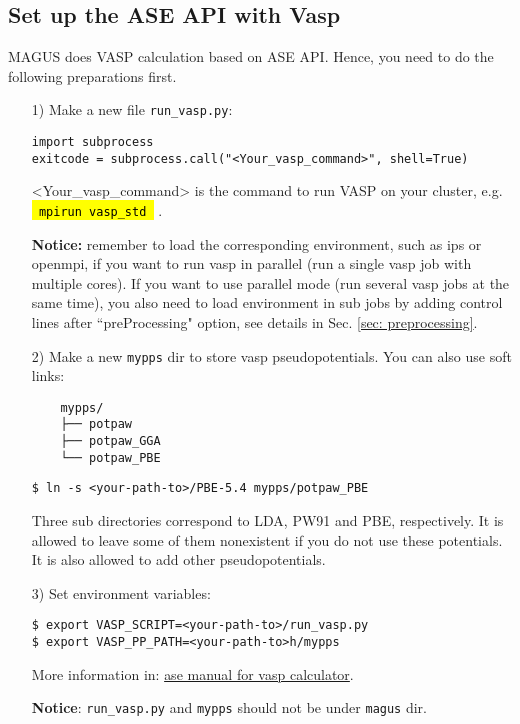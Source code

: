 \documentclass[12pt,oneside]{book}
\newcommand{\code}[1]{
  \begingroup
  \sethlcolor{Seashell}
  {\hl{\texttt{~#1~}}}
  \endgroup
}
\newcommand{\file}[1]{\texttt{#1}}
\begin{document}
\subsection{Set up the ASE API with Vasp}
MAGUS does VASP calculation based on ASE API. Hence, you need to do the following preparations first.
\begin{itemize}
\item [1)] 
    Make a new file \file{run\_vasp.py}:
    \begin{tcolorbox}
    \begin{verbatim}
import subprocess
exitcode = subprocess.call("<Your_vasp_command>", shell=True)
    \end{verbatim}
    \end{tcolorbox}
    <Your\_vasp\_command> is the command to run VASP on your cluster, e.g. \code{mpirun vasp\_std}.

    \textbf{Notice:} remember to load the corresponding environment, such as ips or openmpi, if you want to run vasp in parallel (run a single vasp job with multiple cores). If you want to use parallel mode (run several vasp jobs at the same time), you also need to load environment in sub jobs by adding control lines after ``preProcessing" option, see details in Sec. \ref{sec: preprocessing}.
    
\item [2)] 
    Make a new \file{mypps} dir to store vasp pseudopotentials. You can also use soft links:
    \begin{verbatim}
    mypps/
    ├── potpaw
    ├── potpaw_GGA
    └── potpaw_PBE
    \end{verbatim}
    \begin{tcolorbox}
        \begin{verbatim}
$ ln -s <your-path-to>/PBE-5.4 mypps/potpaw_PBE
        \end{verbatim}
    \end{tcolorbox}
    Three sub directories correspond to LDA, PW91 and PBE, respectively. It is allowed to leave some of them nonexistent if you do not use these potentials. It is also allowed to add other pseudopotentials.
\item [3)] 
    Set environment variables:
    \begin{tcolorbox}
        \begin{verbatim}
$ export VASP_SCRIPT=<your-path-to>/run_vasp.py
$ export VASP_PP_PATH=<your-path-to>h/mypps
        \end{verbatim}
    \end{tcolorbox}
    More information in: \textcolor{blue}{\href{https://wiki.fysik.dtu.dk/ase/ase/calculators/vasp.html\#module-ase.calculators.vasp}{ase manual for vasp calculator}}.\par
    \textbf{Notice}: \file{run\_vasp.py} and \file{mypps} should not be under \file{magus} dir.
\end{itemize}
\end{document}
